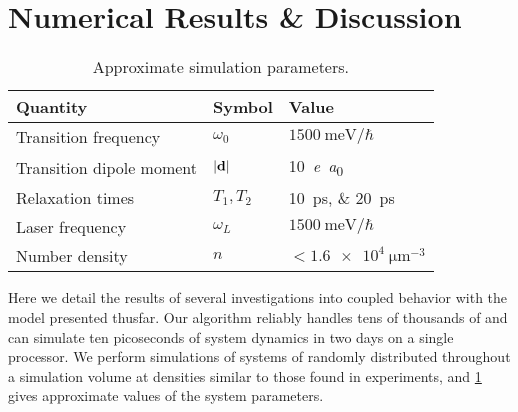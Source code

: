 \section{Numerical Results \& Discussion}
\begin{table}
  \begin{ruledtabular}
    \begin{tabular}{lll}
      Quantity                 & Symbol         & Value                        \\ \hline
      Transition frequency     & $\omega_0$     & $\SI{1500}{\milli\eV}/\hbar$ \\
      Transition dipole moment & $\abs{\vb{d}}$ & \SI{10}{\elementarycharge\bohr} \\
      Relaxation times         & $T_{1}, T_{2}$ & \SIlist{10;20}{\pico\second} \\
      Laser frequency          & $\omega_L$     & $\SI{1500}{\milli\eV}/\hbar$ \\
      Number density           & $n$            & $< \SI{1.6e4}{\micro\meter\tothe{-3}}$ \\
    \end{tabular}
  \end{ruledtabular}
  \caption{\label{table:parameters}Approximate simulation parameters.}
\end{table}

Here we detail the results of several investigations into coupled \qd{} behavior with the model presented thusfar.
Our algorithm reliably handles tens of thousands of \qds{} and can simulate ten picoseconds of system dynamics in two days on a single processor.
We perform simulations of systems of \qds{} randomly distributed throughout a simulation volume at densities similar to those found in experiments, and \cref{table:parameters} gives approximate values of the system parameters.

